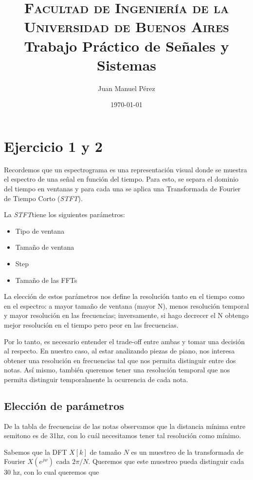 \documentclass[paper=a4, fontsize=11pt]{scrartcl} %
\title{
\normalfont \normalsize
\textsc{Facultad de Ingeniería de la Universidad de Buenos Aires} \\ [20pt] %
\huge Trabajo Práctico de Señales y Sistemas \\ %
}
\author{Juan Manuel Pérez} %
\date{\normalsize\today} %
\numberwithin{equation}{section} %
\numberwithin{figure}{section} %
\numberwithin{table}{section} %
\newcommand{\stft}{\emph{STFT}}
\begin{document}
\maketitle %


\section{Ejercicio 1 y 2}

Recordemos que un espectrograma es una representación visual donde se muestra el espectro de una señal en función del tiempo. Para esto, se separa el dominio del tiempo en ventanas y para cada una se aplica una Transformada de Fourier de Tiempo Corto (\stft).


La \stft tiene los siguientes parámetros:

\begin{itemize}
    \item Tipo de ventana
    \item Tamaño de ventana
    \item Step
    \item Tamaño de las FFTs
\end{itemize}

La elección de estos parámetros nos define la resolución tanto en el tiempo como en el espectro: a mayor tamaño de ventana (mayor N), menos resolución temporal y mayor resolución en las frecuencias; inversamente, si hago decrecer el N obtengo mejor resolución en el tiempo pero peor en las frecuencias.

Por lo tanto, es necesario entender el trade-off entre ambas y tomar una decisión al respecto. En nuestro caso, al estar analizando piezas de piano, nos interesa obtener una resolución en frecuencias tal que nos permita distinguir entre dos notas. Así mismo, también queremos tener una resolución temporal que nos permita distinguir temporalmente la ocurrencia de cada nota.

\subsection{Elección de parámetros}


De la tabla de frecuencias de las notas observamos que la distancia mínima entre semitono es de 31hz, con lo cuál necesitamos tener tal resolución como mínimo.

Sabemos que la DFT $X[k]$ de tamaño $N$ es un muestreo de la transformada de Fourier $X(e^{jw})$ cada $2\pi/N$. Queremos que este muestreo pueda distinguir cada 30 hz, con lo cual queremos que
\end{document}
